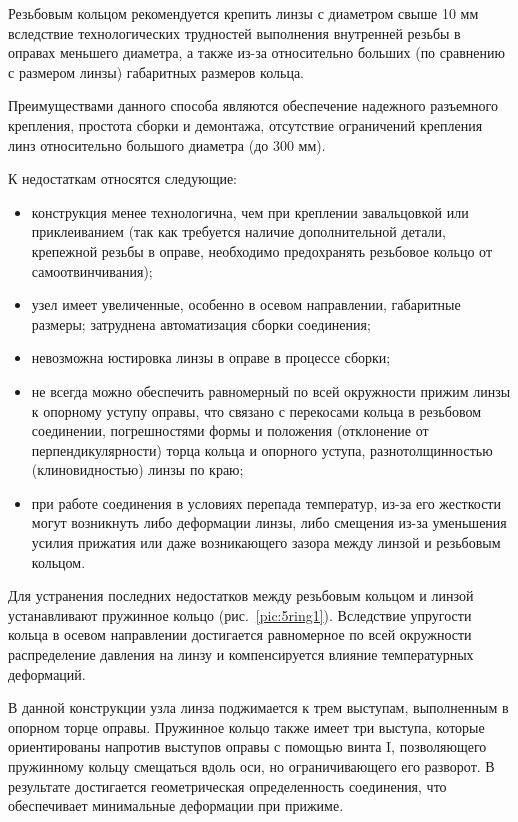 Резьбовым кольцом рекомендуется крепить линзы с диаметром свыше 10 мм вследствие технологических трудностей выполнения внутренней резьбы в оправах меньшего диаметра, а также из-за относительно больших (по сравнению с размером линзы) габаритных размеров кольца.

Преимуществами данного способа являются обеспечение надежного разъемного крепления, простота сборки и демонтажа, отсутствие ограничений крепления линз относительно большого диаметра (до 300 мм). 

К недостаткам относятся следующие:
\begin{itemize}
	\item конструкция менее технологична, чем при креплении завальцовкой или приклеиванием (так как требуется наличие дополнительной детали, крепежной резьбы в оправе, необходимо предохранять резьбовое кольцо от самоотвинчивания);
	\item узел имеет увеличенные, особенно в осевом направлении, габаритные размеры; затруднена автоматизация сборки соединения;
	\item невозможна юстировка линзы в оправе в процессе сборки;
	\item не всегда можно обеспечить равномерный по всей окружности прижим линзы к опорному уступу оправы, что связано с перекосами кольца в резьбовом соединении, погрешностями формы и положения (отклонение от перпендикулярности) торца кольца и опорного уступа, разнотолщинностью (клиновидностью) линзы по краю;
	\item при работе соединения в условиях перепада температур, из-за его жесткости могут возникнуть либо деформации линзы, либо смещения из-за уменьшения усилия прижатия или даже возникающего зазора между линзой и резьбовым кольцом.
\end{itemize}

Для устранения последних недостатков между резьбовым кольцом и линзой устанавливают пружинное кольцо (рис.~\ref{pic:5ring1}). Вследствие упругости кольца в осевом направлении достигается равномерное по всей окружности распределение давления на линзу и компенсируется влияние температурных деформаций. 

В данной конструкции узла линза поджимается к трем выступам, выполненным в опорном торце оправы. Пружинное кольцо также имеет три выступа, которые ориентированы напротив выступов оправы с помощью винта I, позволяющего   пружинному кольцу смещаться вдоль оси, но ограничивающего его разворот. В результате достигается геометрическая определенность соединения, что обеспечивает минимальные деформации при прижиме.

